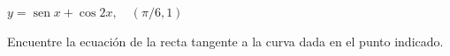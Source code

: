 \item $y = \operatorname{sen} x + \cos 2x, \quad (\pi/6, 1)$
\par
Encuentre la ecuación de la recta tangente a la curva dada en el punto indicado.
